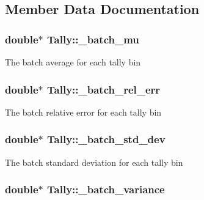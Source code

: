 \subsection{Member Data Documentation}
\hypertarget{classTally_a72b95f77c52db7b5c0447acd77dcb53e}{
\subsubsection[{\-\_\-batch\-\_\-mu}]{\setlength{\rightskip}{0pt plus 5cm}double$\ast$ Tally\-::\-\_\-batch\-\_\-mu\hspace{0.3cm}{\ttfamily [protected]}}}\label{classTally_a72b95f77c52db7b5c0447acd77dcb53e}
The batch average for each tally bin \hypertarget{classTally_a1867b3ec480d667b298c272e475ea027}{
\subsubsection[{\-\_\-batch\-\_\-rel\-\_\-err}]{\setlength{\rightskip}{0pt plus 5cm}double$\ast$ Tally\-::\-\_\-batch\-\_\-rel\-\_\-err\hspace{0.3cm}{\ttfamily [protected]}}}\label{classTally_a1867b3ec480d667b298c272e475ea027}
The batch relative error for each tally bin \hypertarget{classTally_a178d0ba17341fd2109b62a116805bbd0}{
\subsubsection[{\-\_\-batch\-\_\-std\-\_\-dev}]{\setlength{\rightskip}{0pt plus 5cm}double$\ast$ Tally\-::\-\_\-batch\-\_\-std\-\_\-dev\hspace{0.3cm}{\ttfamily [protected]}}}\label{classTally_a178d0ba17341fd2109b62a116805bbd0}
The batch standard deviation for each tally bin \hypertarget{classTally_aac2dbe707a5ab7576a8cbb76114f1530}{
\subsubsection[{\-\_\-batch\-\_\-variance}]{\setlength{\rightskip}{0pt plus 5cm}double$\ast$ Tally\-::\-\_\-batch\-\_\-variance\hspace{0.3cm}{\ttfamily [protected]}}}\label{classTally_aac2dbe707a5ab7576a8cbb76114f1530}

